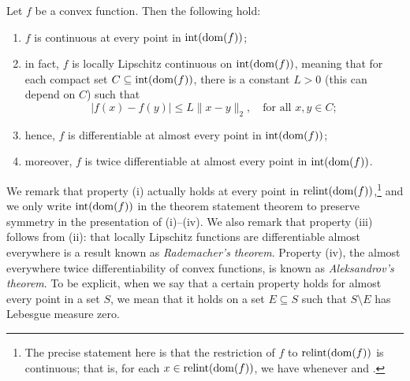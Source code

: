 \begin{Theorem} 
\label{thm:smoothness_properties}
Let $f$ be a convex function. Then the following hold: 
\begin{enumerate}[label=(\roman*)]
\item $f$ is continuous at every point in $\operatorname{int}(\operatorname{dom}(f))$;
\item in fact, $f$ is locally Lipschitz continuous on $\operatorname{int}(\operatorname{dom}(f))$,
  meaning that for each compact set $C \subseteq \operatorname{int}(\operatorname{dom}(f))$, there
  is a constant $L>0$ (this can depend on $C$) such that        
  \[
  |f(x) - f(y)| \leq L \|x-y\|_2, \quad \text{for all $x,y \in C$};
  \]
\item hence, $f$ is differentiable at almost every point in
  $\operatorname{int}(\operatorname{dom}(f))$;   
\item moreover, $f$ is twice differentiable at almost every point in 
  $\operatorname{int}(\operatorname{dom}(f))$.  
\end{enumerate}
\end{Theorem}

We remark that property (i) actually holds at every point in
$\operatorname{relint}(\operatorname{dom}(f))$,\footnote{The precise statement here is that the restriction
  of $f$ to $\operatorname{relint}(\operatorname{dom}(f))$ is continuous; that is, for each $x \in
  \operatorname{relint}(\operatorname{dom}(f))$, we have 
  whenever  and .} 
and we only write $\operatorname{int}(\operatorname{dom}(f))$ in the theorem statement theorem to
preserve symmetry in the presentation of (i)--(iv). We also remark that property 
(iii) follows from (ii): that locally Lipschitz functions are differentiable
almost everywhere is a result known as \emph{Rademacher's theorem}. Property
(iv), the almost everywhere twice differentiability of convex functions, is
known as \emph{Aleksandrov's theorem}. To be explicit, when we say that a
certain property holds for almost every point in a set $S$, we mean that it
holds on a set $E \subseteq S$ such that $S \setminus E$ has Lebesgue measure
zero.


